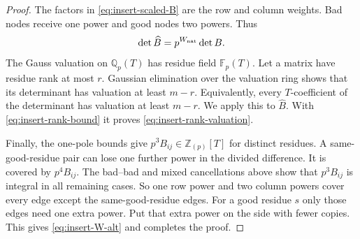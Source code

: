 \begin{proof}
The factors in \eqref{eq:insert-scaled-B} are the row and column
weights.  Bad nodes receive one power and good nodes two powers.  Thus
\begin{equation}
 \det\widehat B=p^{W_{\rm nat}}\det B.
 \label{eq:insert-det-scaling}
\end{equation}
The Gauss valuation on $\mathbb Q_p(T)$ has residue field $\mathbb F_p(T)$.
Let a matrix have residue rank at most $r$.  Gaussian elimination over the
valuation ring shows that its determinant has valuation at least $m-r$.
Equivalently, every $T$-coefficient of the determinant has valuation at
least $m-r$.  We apply this to $\widehat B$.  With
\eqref{eq:insert-rank-bound} it proves \eqref{eq:insert-rank-valuation}.

Finally, the one-pole bounds give $p^3B_{ij}\in\mathbb Z_{(p)}[T]$ for
distinct residues.  A same-good-residue pair can lose one further power in
the divided difference.  It is covered by $p^4B_{ij}$.  The bad--bad and
mixed cancellations above show that $p^3B_{ij}$ is integral in all remaining
cases.  So one row power and two column powers cover every edge except the
same-good-residue edges.  For a good residue $s$ only those edges need one
extra power.  Put that extra power on the side with fewer copies.  This gives
\eqref{eq:insert-W-alt} and completes the proof.
\qedhere
\end{proof}
